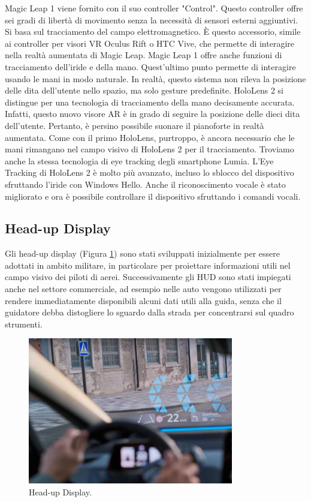 Magic Leap 1 viene fornito con il suo controller "Control". Questo controller offre sei gradi di libertà di movimento senza la necessità di sensori esterni aggiuntivi. Si basa sul tracciamento del campo elettromagnetico. È questo accessorio, simile ai controller per visori VR Oculus Rift o HTC Vive, che permette di interagire nella realtà aumentata di Magic Leap.
Magic Leap 1 offre anche funzioni di tracciamento dell'iride e della mano. Quest'ultimo punto permette di interagire usando le mani in modo naturale. In realtà, questo sistema non rileva la posizione delle dita dell'utente nello spazio, ma solo gesture predefinite.
HoloLens 2 si distingue per una tecnologia di tracciamento della mano decisamente accurata. Infatti, questo nuovo visore AR è in grado di seguire la posizione delle dieci dita dell'utente. Pertanto, è persino possibile suonare il pianoforte in realtà aumentata.
Come con il primo HoloLens, purtroppo, è ancora necessario che le mani rimangano nel campo visivo di HoloLens 2 per il tracciamento.
Troviamo anche la stessa tecnologia di eye tracking degli smartphone Lumia. L'Eye Tracking di HoloLens 2 è molto più avanzato, incluso lo sblocco del dispositivo sfruttando l'iride con Windows Hello. Anche il riconoscimento vocale è stato migliorato e ora è possibile controllare il dispositivo sfruttando i comandi vocali.

\subsection{Head-up Display}
Gli head-up display (Figura \ref{fig:figure18}) sono stati sviluppati inizialmente per essere adottati in ambito militare, in particolare per proiettare informazioni utili nel campo visivo dei piloti di aerei.
Successivamente gli HUD sono stati impiegati anche nel settore commerciale, ad esempio nelle auto vengono utilizzati per rendere immediatamente disponibili alcuni dati utili alla guida, senza che il guidatore debba distogliere lo sguardo dalla strada per concentrarsi sul quadro strumenti.
\begin{figure}[H]
    \centering
    \includegraphics[width=0.8\textwidth]{images/Augmented-Reality-Head-Up-Display.jpg}
    \caption{Head-up Display.}
    \label{fig:figure18}
\end{figure}
\newpage
